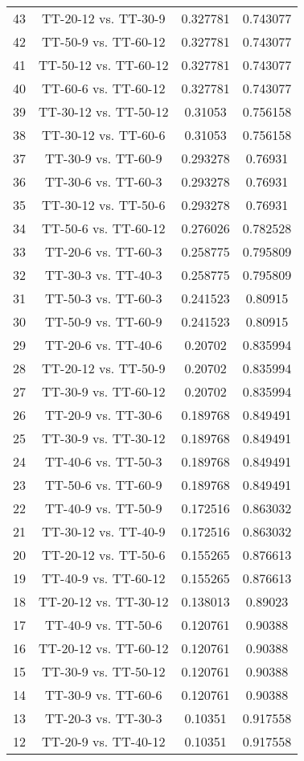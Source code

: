 \documentclass[a4paper,10pt]{article}
\begin{document}
\begin{landscape}
\begin{table}[!htp]
\begin{tabular}{cccc}
43&TT-20-12 vs. TT-30-9&0.327781&0.743077\\
42&TT-50-9 vs. TT-60-12&0.327781&0.743077\\
41&TT-50-12 vs. TT-60-12&0.327781&0.743077\\
40&TT-60-6 vs. TT-60-12&0.327781&0.743077\\
39&TT-30-12 vs. TT-50-12&0.31053&0.756158\\
38&TT-30-12 vs. TT-60-6&0.31053&0.756158\\
37&TT-30-9 vs. TT-60-9&0.293278&0.76931\\
36&TT-30-6 vs. TT-60-3&0.293278&0.76931\\
35&TT-30-12 vs. TT-50-6&0.293278&0.76931\\
34&TT-50-6 vs. TT-60-12&0.276026&0.782528\\
33&TT-20-6 vs. TT-60-3&0.258775&0.795809\\
32&TT-30-3 vs. TT-40-3&0.258775&0.795809\\
31&TT-50-3 vs. TT-60-3&0.241523&0.80915\\
30&TT-50-9 vs. TT-60-9&0.241523&0.80915\\
29&TT-20-6 vs. TT-40-6&0.20702&0.835994\\
28&TT-20-12 vs. TT-50-9&0.20702&0.835994\\
27&TT-30-9 vs. TT-60-12&0.20702&0.835994\\
26&TT-20-9 vs. TT-30-6&0.189768&0.849491\\
25&TT-30-9 vs. TT-30-12&0.189768&0.849491\\
24&TT-40-6 vs. TT-50-3&0.189768&0.849491\\
23&TT-50-6 vs. TT-60-9&0.189768&0.849491\\
22&TT-40-9 vs. TT-50-9&0.172516&0.863032\\
21&TT-30-12 vs. TT-40-9&0.172516&0.863032\\
20&TT-20-12 vs. TT-50-6&0.155265&0.876613\\
19&TT-40-9 vs. TT-60-12&0.155265&0.876613\\
18&TT-20-12 vs. TT-30-12&0.138013&0.89023\\
17&TT-40-9 vs. TT-50-6&0.120761&0.90388\\
16&TT-20-12 vs. TT-60-12&0.120761&0.90388\\
15&TT-30-9 vs. TT-50-12&0.120761&0.90388\\
14&TT-30-9 vs. TT-60-6&0.120761&0.90388\\
13&TT-20-3 vs. TT-30-3&0.10351&0.917558\\
12&TT-20-9 vs. TT-40-12&0.10351&0.917558\\

\end{tabular}
\end{table}
\end{landscape}
\end{document}
